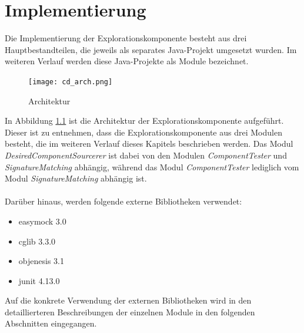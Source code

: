 \chapter{Implementierung}
Die Implementierung der Explorationskomponente besteht aus drei Hauptbestandteilen, die jeweils als separates Java-Projekt umgesetzt wurden. Im weiteren Verlauf werden diese Java-Projekte als Module bezeichnet.
\begin{figure}[h!]
\centering
\texttt{[image: cd\_arch.png]}
\caption{Architektur}
\label{cd_arch}
\end{figure}
\noindent
In Abbildung \ref{cd_arch} ist die Architektur der Explorationskomponente aufgeführt. Dieser ist zu entnehmen, dass die Explorationskomponente aus drei Modulen besteht, die im weiteren Verlauf dieses Kapitels beschrieben werden. Das Modul \emph{DesiredComponentSourcerer} ist dabei von den Modulen \emph{ComponentTester} und \emph{SignatureMatching} abhängig, während das Modul \emph{ComponentTester} lediglich vom Modul \emph{SignatureMatching} abhängig ist.
\\\\
Darüber hinaus, werden folgende externe Bibliotheken verwendet:
\begin{itemize}
\item easymock 3.0 \cite{easymock}
\item cglib 3.3.0 \cite{cglib}
\item objenesis 3.1 \cite{objenesis}
\item junit 4.13.0 \cite{junit}
\end{itemize}
Auf die konkrete Verwendung der externen Bibliotheken wird in den detaillierteren Beschreibungen der einzelnen Module in den folgenden Abschnitten eingegangen.
